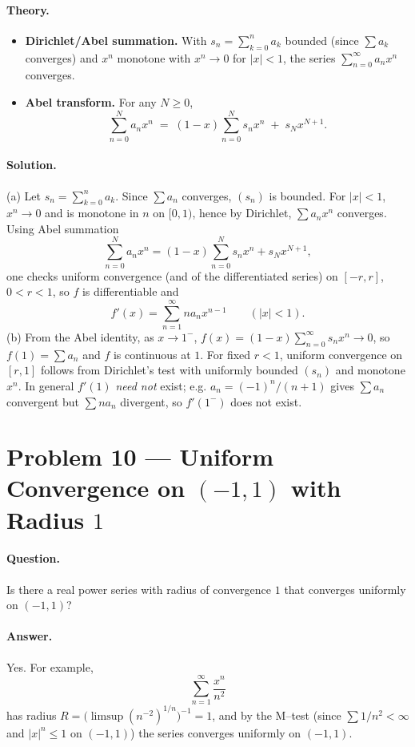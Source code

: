 \documentclass[12pt,a4paper]{article}
\theoremstyle{plain}
\theoremstyle{definition}
\theoremstyle{remark}
\theoremstyle{remark}
\begin{document}
\paragraph{Theory.}
\begin{itemize}
	\item \textbf{Dirichlet/Abel summation.}
	With \(s_n=\sum_{k=0}^n a_k\) bounded (since \(\sum a_k\) converges) and \(x^n\) monotone with \(x^n\to0\) for \(|x|<1\),
	the series \(\displaystyle \sum_{n=0}^\infty a_n x^n\) converges.
	
	\item \textbf{Abel transform.} For any \(N\ge0\),
	\[
	\sum_{n=0}^{N} a_n x^n
	\;=\;
	(1-x)\sum_{n=0}^{N} s_n x^n \;+\; s_N x^{N+1}.
	\]
\end{itemize}


\paragraph{Solution.}
(a) Let $s_n=\sum_{k=0}^n a_k$. Since $\sum a_n$ converges, $(s_n)$ is bounded. For $|x|<1$, $x^n\to0$ and is monotone in $n$ on $[0,1)$, hence by Dirichlet,
$\sum a_n x^n$ converges. Using Abel summation
\[
\sum_{n=0}^N a_n x^n=(1-x)\sum_{n=0}^N s_n x^n+s_N x^{N+1},
\]
one checks uniform convergence (and of the differentiated series) on $[-r,r]$, $0<r<1$, so $f$ is differentiable and
\[
f'(x)=\sum_{n=1}^\infty n a_n x^{n-1}\qquad (|x|<1).
\]
(b) From the Abel identity, as $x\to1^-$,
\(
f(x)=(1-x)\sum_{n=0}^\infty s_n x^n \to 0
\),
so $f(1)=\sum a_n$ and $f$ is continuous at $1$. For fixed $r<1$, uniform convergence on $[r,1]$ follows from Dirichlet’s test with uniformly bounded $(s_n)$ and monotone $x^n$.
In general $f'(1)$ \emph{need not} exist; e.g. $a_n=(-1)^n/(n+1)$ gives $\sum a_n$ convergent but $\sum n a_n$ divergent, so $f'(1^-)$ does not exist.

\bigskip
\section*{Problem 10 — Uniform Convergence on $(-1,1)$ with Radius $1$}

\paragraph{Question.}
Is there a real power series with radius of convergence $1$ that converges uniformly on $(-1,1)$?

\paragraph{Answer.}
Yes. For example,
\[
\sum_{n=1}^\infty \frac{x^n}{n^2}
\]
has radius $R=\big(\limsup (n^{-2})^{1/n}\big)^{-1}=1$, and by the M–test (since $\sum 1/n^2<\infty$ and $|x|^n\le1$ on $(-1,1)$) the series converges uniformly on $(-1,1)$.
\end{document}
